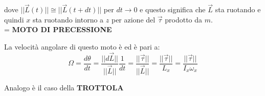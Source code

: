 \documentclass[12pt]{article}
\begin{document}
\vspace{0.5cm}
\begin{minipage}{0.3\textwidth}
\end{minipage}
\begin{minipage}{0.65\textwidth}
dove $||\vec{L}(t)|| \cong ||\vec{L}(t+dt)||$ per $dt \to 0$ e questo significa che $\vec{L}$ sta ruotando e quindi $x$ sta ruotando intorno a $z$ per azione del $\vec{\tau}$ prodotto da $m$. \\
= \textbf{MOTO DI PRECESSIONE}
\end{minipage}

\vspace{0.5cm}
La velocità angolare di questo moto è \fbox{$\Omega \ll \omega$} ed è pari a:
$$ \Omega = \frac{d\theta}{dt} = \frac{||d\vec{L}||}{||\vec{L}||} \frac{1}{dt} = \frac{||\vec{\tau}||}{||\vec{L}||} = \frac{||\vec{\tau}||}{L_x} = \frac{||\vec{\tau}||}{I_x \omega_x} $$

\vspace{0.5cm}
\noindent Analogo è il caso della \textbf{TROTTOLA}
\end{document}
